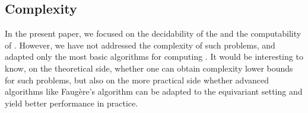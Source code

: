 %
%

\subsection{Complexity} In the present paper, we focused on the
decidability of the  and the
computability of . However, we have not addressed
the complexity of such problems, and adapted only the most basic
algorithms for computing . It would be interesting to know,
on the theoretical side, whether one can obtain complexity lower bounds for such
problems, but also on the more practical side whether advanced algorithms like
Faugère's algorithm \cite{FAUGERE02} can be adapted to the equivariant setting
and yield better performance in practice.


